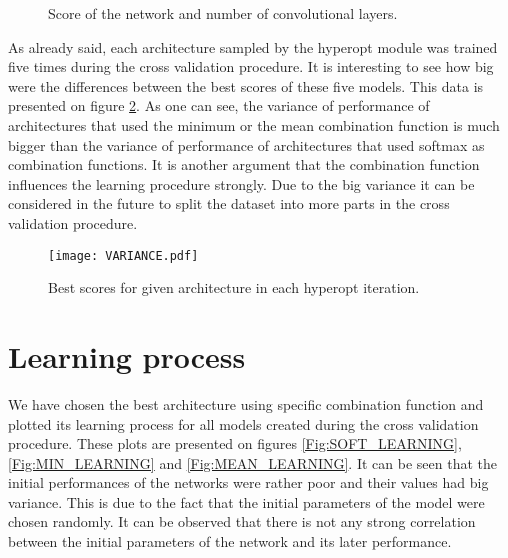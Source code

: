 \documentclass[a4paper,10pt]{report}
\begin{document}
     \begin{figure}
      \begin {minipage}{\textwidth}
	\caption{Score of the network and number of convolutional layers.}\label{Fig:SOFT_LAYERS_SCORE}
      \end{minipage}
    \end{figure}
    

    As already said, each architecture sampled by the hyperopt module was trained five times during the cross validation procedure. It is interesting to see how big were the differences between the best scores of these five models. This data is presented on figure \ref{VARIANCE}. As one can see, the variance of performance of architectures that used the minimum or the mean combination function is much bigger than the variance of performance of architectures that used softmax as combination functions. It is another argument that the combination function influences the learning procedure strongly. Due to the big variance it can be considered in the future to split the dataset into more parts in the cross validation procedure.

      \begin{figure}[h!]
	\centering
	\texttt{[image: VARIANCE.pdf]}
	\caption{Best scores for given architecture in each hyperopt iteration.}
	\label{VARIANCE}
      \end{figure}
      
    \section{Learning process}

    We have chosen the best architecture using specific combination function and plotted its learning process for all models created during the cross validation procedure. These plots are presented on figures \ref{Fig:SOFT_LEARNING}, \ref{Fig:MIN_LEARNING} and \ref{Fig:MEAN_LEARNING}. It can be seen that the initial performances of the networks were rather poor and their values had big variance. This is due to the fact that the initial parameters of the model were chosen randomly. It can be observed that there is not any strong correlation between the initial parameters of the network and its later performance. 
    
\end{document}
